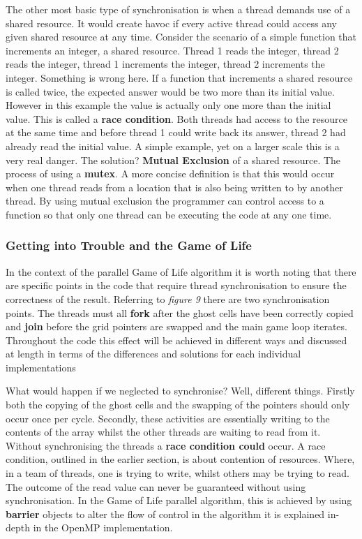 \documentclass[11pt]{article} %
\begin{document}
The other most basic type of synchronisation is when a thread demands use of a shared resource. It would create havoc if every active thread could access any given shared resource at any time. Consider the scenario of a simple function that increments an integer, a shared resource. Thread 1 reads the integer, thread 2 reads the integer, thread 1 increments the integer, thread 2 increments the integer. Something is wrong here. If a function that increments a shared resource is called twice, the expected answer would be two more than its initial value. However in this example the value is actually only one more than the initial value. This is called a {\bf race condition}. Both threads had access to the resource at the same time and before thread 1 could write back its answer, thread 2 had already read the initial value. A simple example, yet on a larger scale this is a very real danger. The solution? {\bf Mutual Exclusion} of a shared resource. The process of using a {\bf mutex}. \cite[p272]{ref14} A more concise definition is that this would occur when one thread reads from a location that is also being written to by another thread. By using mutual exclusion the programmer can control access to a function so that only one thread can be executing the code at any one time. \cite[p18]{ref14}
\subsubsection{Getting into Trouble and the Game of Life}
In the context of the parallel Game of Life algorithm it is worth noting that there are specific points in the code that require thread synchronisation to ensure the correctness of the result. Referring to {\it figure 9} there are two synchronisation points. The threads must all {\bf fork} after the ghost cells have been correctly copied and {\bf join} before the grid pointers are swapped and the main game loop iterates. Throughout the code this effect will be achieved in different ways and discussed at length in terms of the differences and solutions for each individual implementations

What would happen if we neglected to synchronise? Well, different things. Firstly both the copying of the ghost cells and the swapping of the pointers should only occur once per cycle. Secondly, these activities are essentially writing to the contents of the array whilst the other threads are waiting to read from it. Without synchronising the threads a {\bf race condition could} occur. A race condition, outlined in the earlier section, is about contention of resources. Where, in a team of threads, one is trying to write, whilst others may be trying to read. The outcome of the read value can never be guaranteed without using synchronisation. In the Game of Life parallel algorithm, this is achieved by using {\bf barrier} objects to alter the flow of control in the algorithm it is explained in-depth in the OpenMP implementation.
\end{document}
